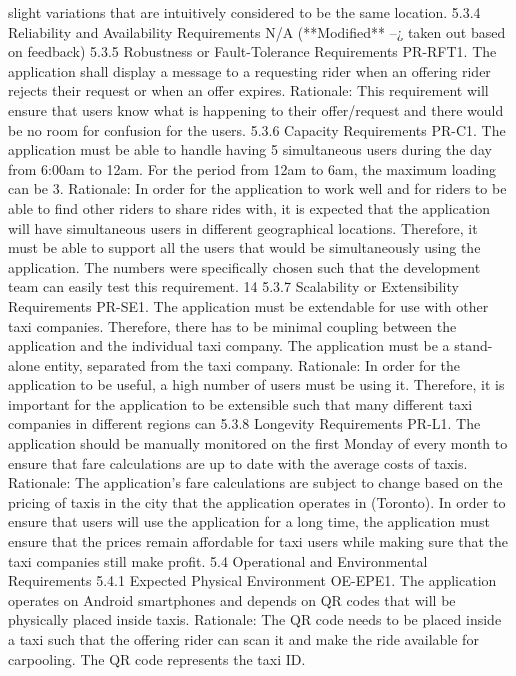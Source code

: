 slight variations that are intuitively considered to be the same location.
5.3.4 Reliability and Availability Requirements
N/A (**Modified** –¿ taken out based on feedback)
5.3.5 Robustness or Fault-Tolerance Requirements
PR-RFT1. The application shall display a message to a requesting rider when an offering rider
rejects their request or when an offer expires.
Rationale: This requirement will ensure that users know what is happening to their offer/request and there would be no room for confusion for the users.
5.3.6 Capacity Requirements
PR-C1. The application must be able to handle having 5 simultaneous users during the day
from 6:00am to 12am. For the period from 12am to 6am, the maximum loading can be 3.
Rationale: In order for the application to work well and for riders to be able to find other
riders to share rides with, it is expected that the application will have simultaneous users in
different geographical locations. Therefore, it must be able to support all the users that would
be simultaneously using the application. The numbers were specifically chosen such that the
development team can easily test this requirement.
14
5.3.7 Scalability or Extensibility Requirements
PR-SE1. The application must be extendable for use with other taxi companies. Therefore,
there has to be minimal coupling between the application and the individual taxi company.
The application must be a stand-alone entity, separated from the taxi company.
Rationale: In order for the application to be useful, a high number of users must be using it.
Therefore, it is important for the application to be extensible such that many different taxi
companies in different regions can
5.3.8 Longevity Requirements
PR-L1. The application should be manually monitored on the first Monday of every month to
ensure that fare calculations are up to date with the average costs of taxis.
Rationale: The application’s fare calculations are subject to change based on the pricing of
taxis in the city that the application operates in (Toronto). In order to ensure that users
will use the application for a long time, the application must ensure that the prices remain
affordable for taxi users while making sure that the taxi companies still make profit.
5.4 Operational and Environmental Requirements
5.4.1 Expected Physical Environment
OE-EPE1. The application operates on Android smartphones and depends on QR codes that
will be physically placed inside taxis.
Rationale: The QR code needs to be placed inside a taxi such that the offering rider can scan
it and make the ride available for carpooling. The QR code represents the taxi ID.
